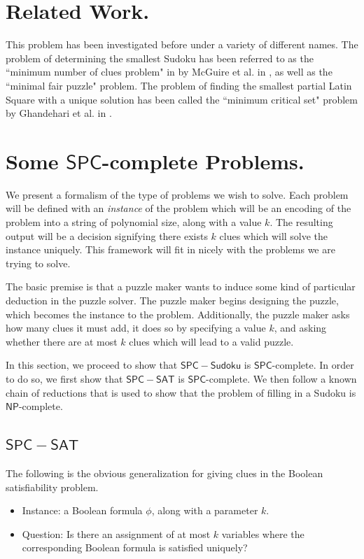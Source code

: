 \documentclass[runningheads,a4paper]{llncs}
\begin{document}
\section{Related Work.}

This problem has been investigated before under a variety of different names. The problem of determining the smallest Sudoku has been referred to as the ``minimum number of clues problem" in
by McGuire et al. in \cite{mcguire2012there}, as well as the ``minimal fair puzzle" problem. The problem of finding the smallest partial Latin Square with a unique solution has been called the ``minimum critical set" problem by Ghandehari et al. in \cite{Ghandehari2005121} .

\section{Some $\mathsf{SPC}$-complete Problems.}
\label{sec:The Problems}

We present a formalism of the type of problems we wish to solve. Each problem will be defined with an \emph{instance} of the problem which will be an encoding of the problem into a string of polynomial size, along with a value $k$. The resulting output will be a decision signifying there exists $k$ clues which will solve the instance uniquely. This framework will fit in nicely with the problems we are trying to solve.

The basic premise is that a puzzle maker wants to induce some kind of particular deduction in the puzzle solver. The puzzle maker begins designing the puzzle, which becomes the instance to the problem. Additionally, the puzzle maker asks how many clues it must add, it does so by specifying a value $k$, and asking whether there are at most $k$ clues which will lead to a valid puzzle.

In this section, we proceed to show that $\mathsf{SPC-Sudoku}$ is $\mathsf{SPC}$-complete. In order to do so, we first show that $\mathsf{SPC-SAT}$ is $\mathsf{SPC}$-complete. We then follow a known chain of reductions that is used to show that the problem of filling in a Sudoku is $\mathsf{NP}$-complete. 

\subsection{$\mathsf{SPC-SAT}$}
The following is the obvious generalization for giving clues in the Boolean satisfiability problem.

\begin{itemize}
\item Instance: a Boolean formula $\phi$, along with a parameter $k$.
\item Question: Is there an assignment of at most $k$ variables where the corresponding Boolean formula is satisfied uniquely?
\end{itemize}
\end{document}
